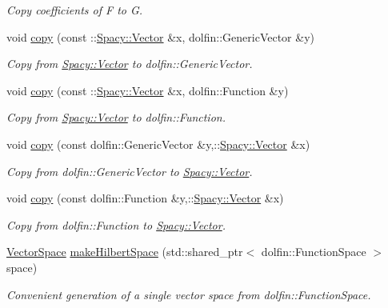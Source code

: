 \begin{DoxyCompactItemize}
\begin{DoxyCompactList}\small\item\em \-Copy coefficients of \-F to \-G. \end{DoxyCompactList}\item 
void \hyperlink{group__FenicsGroup_ga7f43f0c660d0646adb031b453c536bb0}{copy} (const \-::\hyperlink{classSpacy_1_1Vector}{\-Spacy\-::\-Vector} \&x, dolfin\-::\-Generic\-Vector \&y)
\begin{DoxyCompactList}\small\item\em \-Copy from \hyperlink{classSpacy_1_1Vector}{\-Spacy\-::\-Vector} to dolfin\-::\-Generic\-Vector. \end{DoxyCompactList}\item 
void \hyperlink{group__FenicsGroup_ga28fb1ebae29e07ec0256bb2331599aa7}{copy} (const \-::\hyperlink{classSpacy_1_1Vector}{\-Spacy\-::\-Vector} \&x, dolfin\-::\-Function \&y)
\begin{DoxyCompactList}\small\item\em \-Copy from \hyperlink{classSpacy_1_1Vector}{\-Spacy\-::\-Vector} to dolfin\-::\-Function. \end{DoxyCompactList}\item 
void \hyperlink{group__FenicsGroup_ga61c5e45dbb789c155fbf86f8ec288f17}{copy} (const dolfin\-::\-Generic\-Vector \&y,\-::\hyperlink{classSpacy_1_1Vector}{\-Spacy\-::\-Vector} \&x)
\begin{DoxyCompactList}\small\item\em \-Copy from dolfin\-::\-Generic\-Vector to \hyperlink{classSpacy_1_1Vector}{\-Spacy\-::\-Vector}. \end{DoxyCompactList}\item 
void \hyperlink{namespaceSpacy_1_1FEniCS_a7c4519bd0cbdc4e72b71f273bade591e}{copy} (const dolfin\-::\-Function \&y,\-::\hyperlink{classSpacy_1_1Vector}{\-Spacy\-::\-Vector} \&x)
\begin{DoxyCompactList}\small\item\em \-Copy from dolfin\-::\-Function to \hyperlink{classSpacy_1_1Vector}{\-Spacy\-::\-Vector}. \end{DoxyCompactList}\item 
\hyperlink{classSpacy_1_1VectorSpace}{\-Vector\-Space} \hyperlink{group__FenicsGroup_ga8b67cb3d0188d2398625595b79e2fa6a}{make\-Hilbert\-Space} (std\-::shared\-\_\-ptr$<$ dolfin\-::\-Function\-Space $>$ space)
\begin{DoxyCompactList}\small\item\em \-Convenient generation of a single vector space from dolfin\-::\-Function\-Space. \end{DoxyCompactList}\item 

\end{DoxyCompactItemize}
